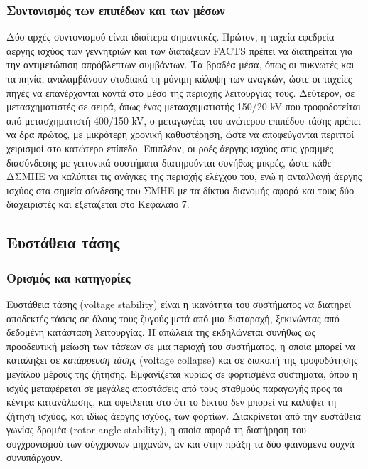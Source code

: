 \subsubsection{Συντονισμός των επιπέδων και των μέσων}

Δύο αρχές συντονισμού είναι ιδιαίτερα σημαντικές. Πρώτον, η ταχεία εφεδρεία άεργης ισχύος των
γεννητριών και των διατάξεων FACTS πρέπει να διατηρείται για την αντιμετώπιση απρόβλεπτων
συμβάντων. Τα βραδέα μέσα, όπως οι πυκνωτές και τα πηνία, αναλαμβάνουν σταδιακά τη μόνιμη
κάλυψη των αναγκών, ώστε οι ταχείες πηγές να επανέρχονται κοντά στο μέσο της περιοχής
λειτουργίας τους. Δεύτερον, σε μετασχηματιστές σε σειρά, όπως ένας μετασχηματιστής 150/20 kV
που τροφοδοτείται από μετασχηματιστή 400/150 kV, ο μεταγωγέας του ανώτερου επιπέδου τάσης πρέπει
να δρα πρώτος, με μικρότερη χρονική καθυστέρηση, ώστε να αποφεύγονται περιττοί χειρισμοί στο
κατώτερο επίπεδο. Επιπλέον, οι ροές άεργης ισχύος στις γραμμές διασύνδεσης με γειτονικά
συστήματα διατηρούνται συνήθως μικρές, ώστε κάθε ΔΣΜΗΕ να καλύπτει τις ανάγκες της περιοχής
ελέγχου του, ενώ η ανταλλαγή άεργης ισχύος στα σημεία σύνδεσης του ΣΜΗΕ με τα
δίκτυα διανομής αφορά και τους δύο διαχειριστές και εξετάζεται στο Κεφάλαιο 7.

\subsection{Ευστάθεια τάσης}
\label{sec:v-stability}

\subsubsection{Ορισμός και κατηγορίες}

Ευστάθεια τάσης (voltage stability) είναι η ικανότητα του συστήματος να διατηρεί αποδεκτές
τάσεις σε όλους τους ζυγούς μετά από μια διαταραχή, ξεκινώντας από δεδομένη κατάσταση
λειτουργίας. Η απώλειά της εκδηλώνεται συνήθως ως προοδευτική μείωση των τάσεων σε μια περιοχή
του συστήματος, η οποία μπορεί να καταλήξει σε \emph{κατάρρευση τάσης} (voltage collapse) και
σε διακοπή της τροφοδότησης μεγάλου μέρους της ζήτησης. Εμφανίζεται κυρίως σε φορτισμένα
συστήματα, όπου η ισχύς μεταφέρεται σε μεγάλες αποστάσεις από τους σταθμούς παραγωγής προς τα
κέντρα κατανάλωσης, και οφείλεται στο ότι το δίκτυο δεν μπορεί να καλύψει τη ζήτηση ισχύος, και
ιδίως άεργης ισχύος, των φορτίων. Διακρίνεται από την ευστάθεια γωνίας δρομέα (rotor angle
stability), η οποία αφορά τη
διατήρηση του συγχρονισμού των σύγχρονων μηχανών, αν και στην πράξη τα δύο φαινόμενα συχνά
συνυπάρχουν.

